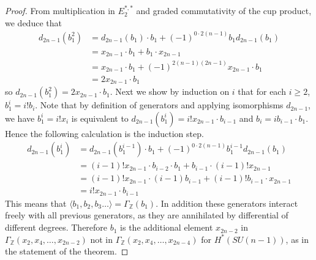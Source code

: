 \documentclass{article}
\theoremstyle{plain}
\theoremstyle{definition}
\numberwithin{thm}{section}
\begin{document}
\begin{proof}
			From multiplication in $E^{*,*}_{2}$ and graded commutativity of the cup product,
			we deduce that
			\begin{equation*}
				\begin{aligned}
						d_{2n-1}(b_{1}^{2}) &=d_{2n-1}(b_{1})\cdot b_{1} +(-1)^{0 \cdot 2(n-1)}b_{1}d_{2n-1}(b_{1}) \\
						&= x_{2n-1} \cdot b_{1} + b_{1} \cdot x_{2n-1}                          \\
						&= x_{2n-1} \cdot b_{1} + (-1)^{2(n-1)(2n-1)} x_{2n-1} \cdot b_{1}            \\
						&= 2x_{2n-1} \cdot b_{1}                                    
				\end{aligned}
			\end{equation*}
			so $d_{2n-1}(b_{1}^{2})=2x_{2n-1} \cdot b_{1}$.
			Next we show by induction on $i$ that for each $i \geq 2$, $b_{1}^{i}=i!b_{i}$.
			Note that by definition of generators and applying isomorphisms $d_{2n-1}$,
			we have $b_{1}^{i}=i!x_{i}$ is equivalent to $d_{2n-1}(b_{1}^{i})= i! x_{2n-1} \cdot b_{i-1}$
			and $b_{i}= i b_{i-1} \cdot b_{1}$.
			Hence the following calculation is the induction step.
			\begin{equation*}
				\begin{aligned}
						d_{2n-1}(b_{1}^{i}) &=d_{2n-1}(b_{1}^{i-1})\cdot b_{1} +(-1)^{0 \cdot 2(n-1)}b_{1}^{i-1}d_{2n-1}(b_{1}) \\
						&=(i-1)! x_{2n-1} \cdot b_{i-2} \cdot b_{1} + b_{i-1} \cdot (i-1)!x_{2n-1} \\
						&=(i-1)! x_{2n-1} \cdot (i-1) b_{i-1} + (i-1)! b_{i-1} \cdot x_{2n-1} \\
						&=i! x_{2n-1} \cdot b_{i-1}
				\end{aligned}
			\end{equation*}
			This means that $\langle b_{1},b_{2},b_{3} \dots \rangle = {\Gamma}_{\mathbb{Z}}(b_{1})$.
			In addition these generators interact freely with all previous generators, as they are annihilated by differential of different degrees.
			Therefore $b_1$ is the additional element $x_{2n-2}$ in ${\Gamma}_{\mathbb{Z}}(x_2,x_4, \dots ,x_{2n-2})$ 
			not in ${\Gamma}_{\mathbb{Z}}(x_2,x_4, \dots ,x_{2n-4})$ for $H^*(SU(n-1))$, as in the statement of the theorem.
			

\end{proof}
\end{document}
